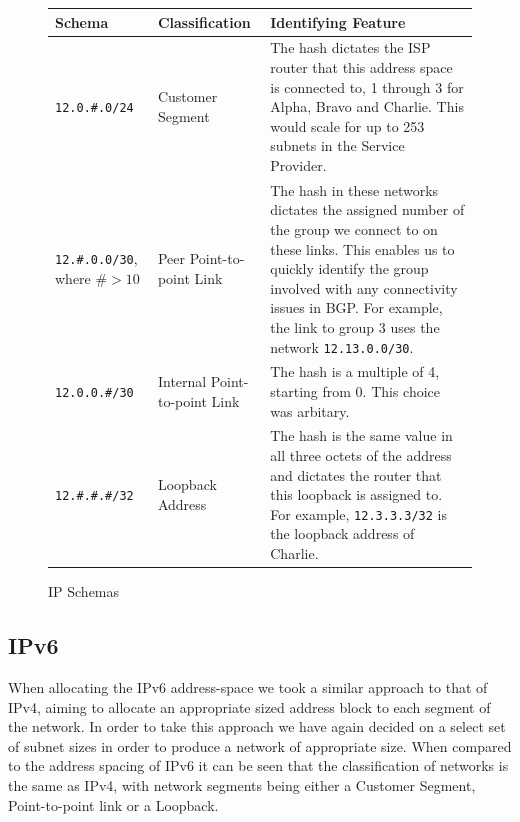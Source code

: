 \begin{figure}[!ht]
    \caption{IP Schemas}
    \label{figure:network-alloc-2}
    \centering
    \begin{tabular}{|p{3cm}|p{3cm}|p{5cm}|}

        \hline
        \textbf{Schema} & \textbf{Classification} & \textbf{Identifying Feature} \\

        \hline
        \texttt{12.0.\#.0/24} & Customer Segment & The hash dictates the ISP
        router that this address space is connected to, 1 through 3 for Alpha, Bravo
        and Charlie. This would scale for up to 253 subnets in the Service Provider.\\

        \hline
        \texttt{12.\#.0.0/30}, where $\#> 10$ & Peer Point-to-point Link &
        The hash in these networks dictates the assigned number of the group we connect
        to on these links. This enables us to quickly identify the group involved with
        any connectivity issues in BGP. For example, the link to group 3 uses the
        network \texttt{12.13.0.0/30}.\\

        \hline
        \texttt{12.0.0.\#/30} & Internal Point-to-point Link &
        The hash is a multiple of 4, starting from 0. This choice was arbitary.\\

        \hline
        \texttt{12.\#.\#.\#/32} & Loopback Address & The hash is
        the same value in all three octets of the address and dictates the router that
        this loopback is assigned to. For example, \texttt{12.3.3.3/32} is the loopback
        address of Charlie.\\

        \hline
    \end{tabular}
\end{figure}

\clearpage

\subsection{IPv6}
When allocating the IPv6 address-space we took a similar
approach to that of IPv4, aiming to allocate an appropriate sized address block
to each segment of the network. In order to take this approach we have again
decided on a select set of subnet sizes in order to produce a network of
appropriate size. When compared to the address spacing of IPv6 it can be seen
that the classification of networks is the same as IPv4, with network segments
being either a Customer Segment, Point-to-point link or a Loopback.

